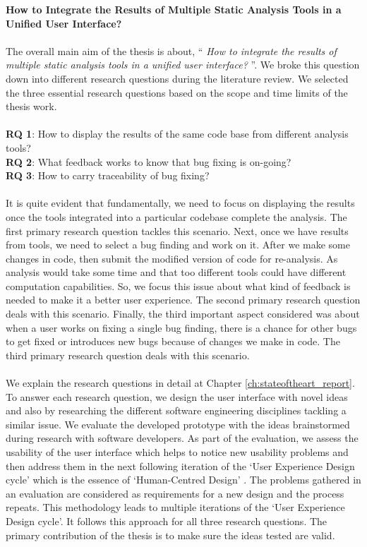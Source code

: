 \textbf{How to Integrate the Results of Multiple Static Analysis Tools in a Unified User Interface?}
\\ \\
The overall main aim of the thesis is about, “ \textit{How to integrate the results of multiple static analysis tools in a unified user interface?} ”. We broke this question down into different research questions during the literature review. We selected the three essential research questions based on the scope and time limits of the thesis work. \\ \\

\noindent\textbf{RQ 1}: How to display the results of the same code base from different analysis tools? \\
\textbf{RQ 2}: What feedback works to know that bug fixing is on-going? \\
\textbf{RQ 3}: How to carry traceability of bug fixing? \\ \\

It is quite evident that fundamentally, we need to focus on displaying the results once the tools integrated into a particular codebase complete the analysis. The first primary research question tackles this scenario. Next, once we have results from tools, we need to select a bug finding and work on it. After we make some changes in code, then submit the modified version of code for re-analysis. As analysis would take some time and that too different tools could have different computation capabilities. So, we focus this issue about what kind of feedback is needed to make it a better user experience. The second primary research question deals with this scenario. Finally, the third important aspect considered was about when a user works on fixing a single bug finding, there is a chance for other bugs to get fixed or introduces new bugs because of changes we make in code. The third primary research question deals with this scenario. \\ \\

We explain the research questions in detail at Chapter \ref{ch:stateoftheart_report}. To answer each research question, we design the user interface with novel ideas and also by researching the different software engineering disciplines tackling a similar issue. We evaluate the developed prototype with the ideas brainstormed during research with software developers. As part of the evaluation, we assess the usability \cite{usability} of the user interface which helps to notice new usability problems and then address them in the next following iteration of the ‘User Experience Design cycle’ \cite{UXD} which is the essence of ‘Human-Centred Design’ \cite{hcd}. The problems gathered in an evaluation are considered as requirements for a new design and the process repeats. This methodology leads to multiple iterations of the ‘User Experience Design cycle’. It follows this approach for all three research questions. The primary contribution of the thesis is to make sure the ideas tested are valid. \\ \\

